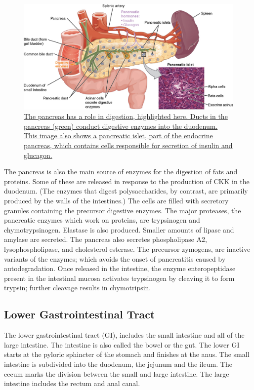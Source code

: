 \begin{figure}

{\centering \includegraphics[width=0.7\linewidth]{./figures/digestive/1820_The_Pancreas} 

}

\caption{\href{https://upload.wikimedia.org/wikipedia/commons/e/e0/1820_The_Pancreas.jpg}{The pancreas has a role in digestion, highlighted here. Ducts in the pancreas (green) conduct digestive enzymes into the duodenum. This image also shows a pancreatic islet, part of the endocrine pancreas, which contains cells responsible for secretion of insulin and glucagon.}}\label{fig:humanpancreas}
\end{figure}

The pancreas is also the main source of enzymes for the digestion of fats and proteins. Some of these are released in response to the production of CKK in the duodenum. (The enzymes that digest polysaccharides, by contrast, are primarily produced by the walls of the intestines.) The cells are filled with secretory granules containing the precursor digestive enzymes. The major proteases, the pancreatic enzymes which work on proteins, are trypsinogen and chymotrypsinogen. Elastase is also produced. Smaller amounts of lipase and amylase are secreted. The pancreas also secretes phospholipase A2, lysophospholipase, and cholesterol esterase. The precursor zymogens, are inactive variants of the enzymes; which avoids the onset of pancreatitis caused by autodegradation. Once released in the intestine, the enzyme enteropeptidase present in the intestinal mucosa activates trypsinogen by cleaving it to form trypsin; further cleavage results in chymotripsin.

\hypertarget{lower-gastrointestinal-tract}{%
\subsection{Lower Gastrointestinal Tract}\label{lower-gastrointestinal-tract}}

The lower gastrointestinal tract (GI), includes the small intestine and all of the large intestine. The intestine is also called the bowel or the gut. The lower GI starts at the pyloric sphincter of the stomach and finishes at the anus. The small intestine is subdivided into the duodenum, the jejunum and the ileum. The cecum marks the division between the small and large intestine. The large intestine includes the rectum and anal canal.

